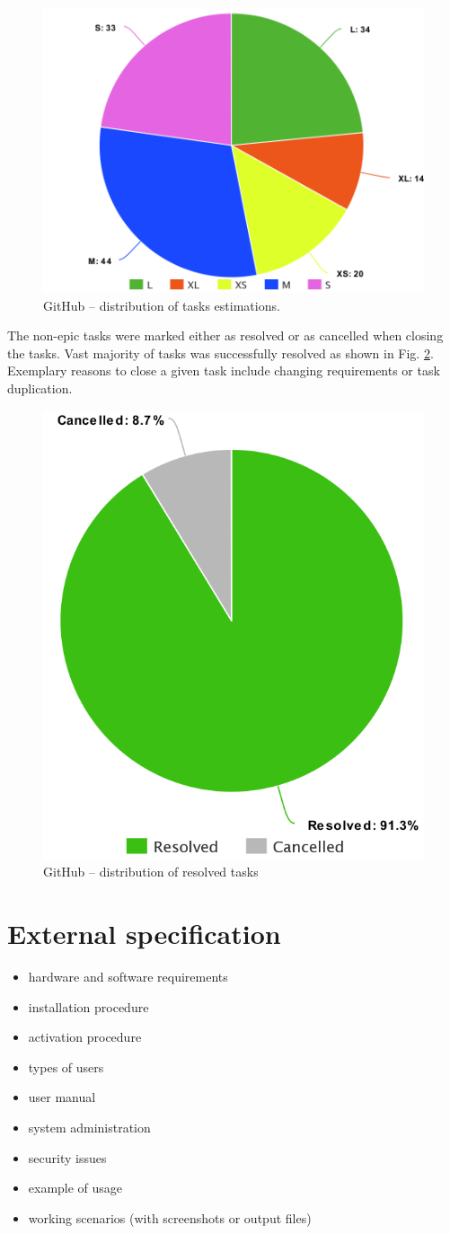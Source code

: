 \documentclass[a4paper,twoside,12pt]{book}
\begin{document}
\begin{figure}
  \centering
  \includegraphics[width=0.65\linewidth]{img/github_issues_sizes.png}
  \caption{GitHub – distribution of tasks estimations.}
  \label{fig:img:estimations}
\end{figure}

The non-epic tasks were marked either as resolved or as cancelled when closing the tasks. Vast majority of tasks was successfully resolved as shown in Fig. \ref{fig:img:resolved_tasks}. Exemplary reasons to close a given task include changing requirements or task duplication.

\begin{figure}
  \centering
  \includegraphics[width=0.5\linewidth]{img/github_issues_finished.png}
  \caption{GitHub – distribution of resolved tasks}
  \label{fig:img:resolved_tasks}
\end{figure}

\chapter{External specification}
\begin{itemize}
\item hardware and software requirements
\item installation procedure
\item activation procedure
\item types of users
\item user manual
\item system administration
\item security issues
\item example of usage
\item working scenarios (with screenshots or output files)
\end{itemize}
\end{document}
